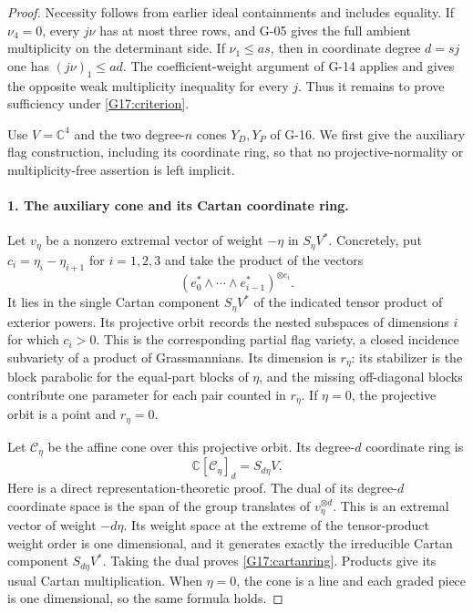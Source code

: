 \begin{proof}
Necessity follows from earlier ideal containments and includes equality.
If $\nu_4=0$, every $j\nu$ has at most three rows, and G-05 gives
the full ambient multiplicity on the determinant side. If
$\nu_1\leq as$, then in coordinate degree $d=sj$ one has
$(j\nu)_1\leq ad$. The coefficient-weight argument of G-14 applies
and gives the opposite weak multiplicity inequality for every $j$.
Thus it remains to prove sufficiency under \eqref{G17:criterion}.

Use $V=\mathbb C^4$ and the two degree-$n$ cones $Y_D,Y_P$ of G-16.
We first give the auxiliary flag construction, including its coordinate
ring, so that no projective-normality or multiplicity-free assertion
is left implicit.

\paragraph{1. The auxiliary cone and its Cartan coordinate ring.}
Let $v_\eta$ be a nonzero extremal vector of weight $-\eta$ in
$S_\eta V^*$. Concretely, put
$c_i=\eta_i-\eta_{i+1}$ for $i=1,2,3$ and take the product of
the vectors
\[
 (e_0^*\wedge\cdots\wedge e_{i-1}^*)^{\otimes c_i}.
\]
It lies in the single Cartan component $S_\eta V^*$ of the indicated
tensor product of exterior powers. Its projective orbit records the
nested subspaces of dimensions $i$ for which $c_i>0$.
This is the corresponding partial flag variety, a closed incidence
subvariety of a product of Grassmannians. Its dimension is
$r_\eta$: its stabilizer is the block parabolic for the equal-part
blocks of $\eta$, and the missing off-diagonal blocks contribute
one parameter for each pair counted in $r_\eta$.
If $\eta=0$, the projective orbit is a point and $r_\eta=0$.

Let $\mathcal C_\eta$ be the affine cone over this projective orbit.
Its degree-$d$ coordinate ring is
\begin{equation}\label{G17:cartanring}
 \mathbb C[\mathcal C_\eta]_d=S_{d\eta}V.
\end{equation}
Here is a direct representation-theoretic proof. The dual of its
degree-$d$ coordinate space is the span of the group translates of
$v_\eta^{\otimes d}$. This is an extremal vector of weight $-d\eta$.
Its weight space at the extreme of the tensor-product weight order
is one dimensional, and it generates exactly the irreducible Cartan
component $S_{d\eta}V^*$. Taking the dual proves
\eqref{G17:cartanring}. Products give its usual Cartan multiplication.
When $\eta=0$, the cone is a line and each graded piece is
one dimensional, so the same formula holds.


\end{proof}
